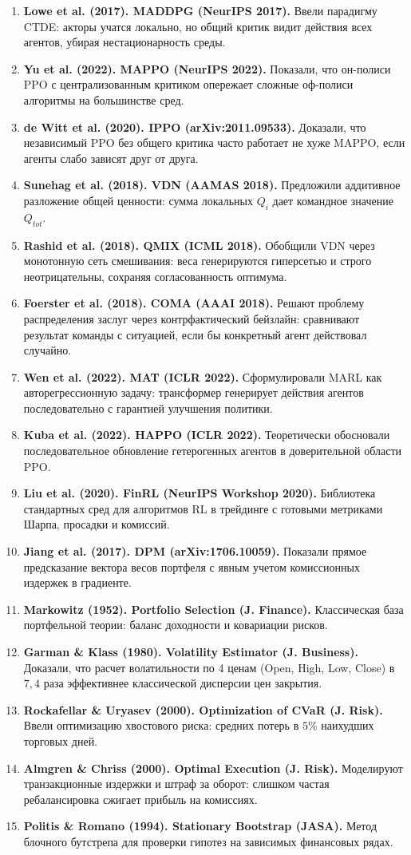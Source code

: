\documentclass[11pt,a4paper]{article}
\begin{document}
\begin{enumerate}[leftmargin=*]
\item \textbf{Lowe et al. (2017). MADDPG (NeurIPS 2017).} Ввели парадигму CTDE: акторы учатся локально, но общий критик видит действия всех агентов, убирая нестационарность среды.
\item \textbf{Yu et al. (2022). MAPPO (NeurIPS 2022).} Показали, что он-полиси PPO с централизованным критиком опережает сложные оф-полиси алгоритмы на большинстве сред.
\item \textbf{de Witt et al. (2020). IPPO (arXiv:2011.09533).} Доказали, что независимый PPO без общего критика часто работает не хуже MAPPO, если агенты слабо зависят друг от друга.
\item \textbf{Sunehag et al. (2018). VDN (AAMAS 2018).} Предложили аддитивное разложение общей ценности: сумма локальных $Q_i$ дает командное значение $Q_{tot}$.
\item \textbf{Rashid et al. (2018). QMIX (ICML 2018).} Обобщили VDN через монотонную сеть смешивания: веса генерируются гиперсетью и строго неотрицательны, сохраняя согласованность оптимума.
\item \textbf{Foerster et al. (2018). COMA (AAAI 2018).} Решают проблему распределения заслуг через контрфактический бейзлайн: сравнивают результат команды с ситуацией, если бы конкретный агент действовал случайно.
\item \textbf{Wen et al. (2022). MAT (ICLR 2022).} Сформулировали MARL как авторегрессионную задачу: трансформер генерирует действия агентов последовательно с гарантией улучшения политики.
\item \textbf{Kuba et al. (2022). HAPPO (ICLR 2022).} Теоретически обосновали последовательное обновление гетерогенных агентов в доверительной области PPO.
\item \textbf{Liu et al. (2020). FinRL (NeurIPS Workshop 2020).} Библиотека стандартных сред для алгоритмов RL в трейдинге с готовыми метриками Шарпа, просадки и комиссий.
\item \textbf{Jiang et al. (2017). DPM (arXiv:1706.10059).} Показали прямое предсказание вектора весов портфеля с явным учетом комиссионных издержек в градиенте.
\item \textbf{Markowitz (1952). Portfolio Selection (J. Finance).} Классическая база портфельной теории: баланс доходности и ковариации рисков.
\item \textbf{Garman \& Klass (1980). Volatility Estimator (J. Business).} Доказали, что расчет волатильности по 4 ценам (Open, High, Low, Close) в $7{,}4$ раза эффективнее классической дисперсии цен закрытия.
\item \textbf{Rockafellar \& Uryasev (2000). Optimization of CVaR (J. Risk).} Ввели оптимизацию хвостового риска: средних потерь в $5\%$ наихудших торговых дней.
\item \textbf{Almgren \& Chriss (2000). Optimal Execution (J. Risk).} Моделируют транзакционные издержки и штраф за оборот: слишком частая ребалансировка сжигает прибыль на комиссиях.
\item \textbf{Politis \& Romano (1994). Stationary Bootstrap (JASA).} Метод блочного бутстрепа для проверки гипотез на зависимых финансовых рядах.
\end{enumerate}
\end{document}

